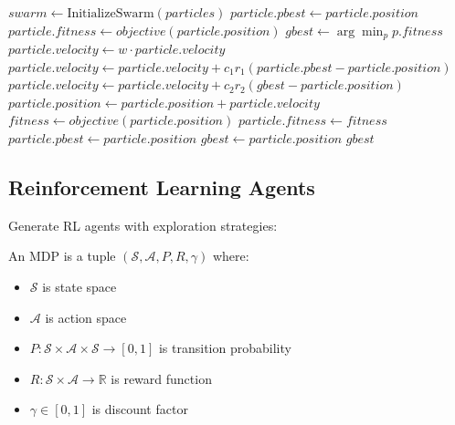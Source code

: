 \begin{algorithm}
\caption{Particle Swarm Optimization}
\begin{algorithmic}[1]
    \State $swarm \gets \text{InitializeSwarm}(particles)$
        \State $particle.pbest \gets particle.position$
        \State $particle.fitness \gets objective(particle.position)$
    \EndFor
    \State $gbest \gets \arg\min_{p} p.fitness$
            \State $particle.velocity \gets w \cdot particle.velocity$
            \State $particle.velocity \gets particle.velocity + c_1 r_1 (particle.pbest - particle.position)$
            \State $particle.velocity \gets particle.velocity + c_2 r_2 (gbest - particle.position)$
            \State $particle.position \gets particle.position + particle.velocity$
            \State $fitness \gets objective(particle.position)$
                \State $particle.fitness \gets fitness$
                \State $particle.pbest \gets particle.position$
            \EndIf
                \State $gbest \gets particle.position$
            \EndIf
        \EndFor
    \EndFor
    \State \Return $gbest$
\EndProcedure
\end{algorithmic}
\end{algorithm}

\subsection{Reinforcement Learning Agents}

Generate RL agents with exploration strategies:

\begin{definition}
    An MDP is a tuple $(\mathcal{S}, \mathcal{A}, P, R, \gamma)$ where:
    \begin{itemize}
        \item $\mathcal{S}$ is state space
        \item $\mathcal{A}$ is action space
        \item $P: \mathcal{S} \times \mathcal{A} \times \mathcal{S} \rightarrow [0,1]$ is transition probability
        \item $R: \mathcal{S} \times \mathcal{A} \rightarrow \mathbb{R}$ is reward function
        \item $\gamma \in [0,1]$ is discount factor
    \end{itemize}
\end{definition}


